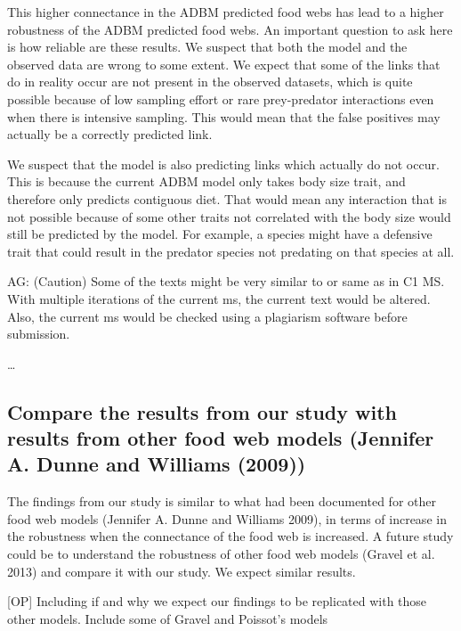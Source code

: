 \documentclass{article}
\begin{document}
This higher connectance in the ADBM predicted food webs has lead to a
higher robustness of the ADBM predicted food webs. An important question
to ask here is how reliable are these results. We suspect that both the
model and the observed data are wrong to some extent. We expect that
some of the links that do in reality occur are not present in the
observed datasets, which is quite possible because of low sampling
effort or rare prey-predator interactions even when there is intensive
sampling. This would mean that the false positives may actually be a
correctly predicted link.

We suspect that the model is also predicting links which actually do not
occur. This is because the current ADBM model only takes body size
trait, and therefore only predicts contiguous diet. That would mean any
interaction that is not possible because of some other traits not
correlated with the body size would still be predicted by the model. For
example, a species might have a defensive trait that could result in the
predator species not predating on that species at all.

AG: (Caution) Some of the texts might be very similar to or same as in
C1 MS. With multiple iterations of the current ms, the current text
would be altered. Also, the current ms would be checked using a
plagiarism software before submission.

\ldots{}

\hypertarget{compare-the-results-from-our-study-with-results-from-other-food-web-models-jennifer-a.-dunne-and-williams-2009}{%
\subsection{Compare the results from our study with results from other
food web models (Jennifer A. Dunne and Williams
(2009))}\label{compare-the-results-from-our-study-with-results-from-other-food-web-models-jennifer-a.-dunne-and-williams-2009}}

The findings from our study is similar to what had been documented for
other food web models (Jennifer A. Dunne and Williams 2009), in terms of
increase in the robustness when the connectance of the food web is
increased. A future study could be to understand the robustness of other
food web models (Gravel et al. 2013) and compare it with our study. We
expect similar results.

{[}OP{]} Including if and why we expect our findings to be replicated
with those other models. Include some of Gravel and Poissot's models
\end{document}
